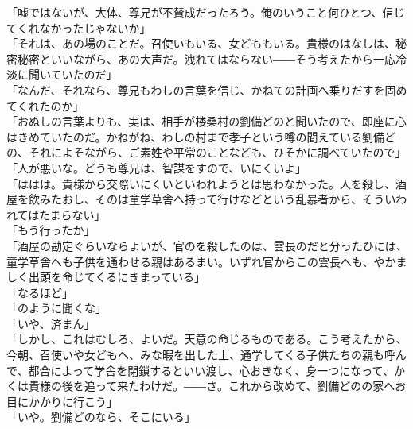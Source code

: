 \documentclass[
  paper=a5,
  fontsize=10pt,
  jafontsize=9.5pt,
  tate,                  %
  open_bracket_pos=nibu, %
]{jlreq}
\begin{document}
「嘘ではないが、大体、尊兄が不賛成だったろう。俺のいうこと何ひとつ、信じてくれなかったじゃないか」\\


「それは、あの場のことだ。召使いもいる、女どももいる。貴様のはなしは、秘密秘密といいながら、あの大声だ。洩れてはならない――そう考えたから一応冷淡に聞いていたのだ」\\


「なんだ、それなら、尊兄もわしの言葉を信じ、かねての計画へ乗りだすを固めてくれたのか」\\


「おぬしの言葉よりも、実は、相手が楼桑村の劉備どのと聞いたので、即座に心はきめていたのだ。かねがね、わしの村まで孝子という噂の聞えている劉備どの、それによそながら、ご素姓や平常のことなども、ひそかに調べていたので」\\


「人が悪いな。どうも尊兄は、智謀をすので、いにくいよ」\\


「ははは。貴様から交際いにくいといわれようとは思わなかった。人を殺し、酒屋を飲みたおし、そのは童学草舎へ持って行けなどという乱暴者から、そういわれてはたまらない」\\


「もう行ったか」\\


「酒屋の勘定ぐらいならよいが、官のを殺したのは、雲長のだと分ったひには、童学草舎へも子供を通わせる親はあるまい。いずれ官からこの雲長へも、やかましく出頭を命じてくるにきまっている」\\


「なるほど」\\


「のように聞くな」\\


「いや、済まん」\\


「しかし、これはむしろ、よいだ。天意の命じるものである。こう考えたから、今朝、召使いや女どもへ、みな暇を出した上、通学してくる子供たちの親も呼んで、都合によって学舎を閉鎖するといい渡し、心おきなく、身一つになって、かくは貴様の後を追って来たわけだ。――さ。これから改めて、劉備どのの家へお目にかかりに行こう」\\


「いや。劉備どのなら、そこにいる」\\
\end{document}
